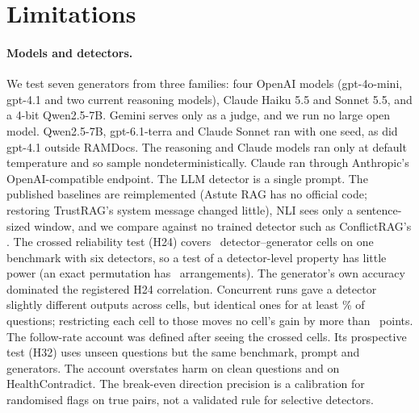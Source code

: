 \section*{Limitations}

\paragraph{Models and detectors.} We test seven generators from three families: four OpenAI models (gpt-4o-mini,
gpt-4.1 and two current reasoning models), Claude Haiku 5.5 and Sonnet 5.5, and a 4-bit Qwen2.5-7B. Gemini
serves only as a judge, and we run no large open model. Qwen2.5-7B, gpt-6.1-terra and Claude Sonnet ran with one seed,
as did gpt-4.1 outside RAMDocs. The reasoning and Claude models ran only at default temperature and so sample
nondeterministically. Claude ran through Anthropic's OpenAI-compatible endpoint. The LLM detector is a single
prompt. The published baselines are reimplemented (Astute RAG has no official code; restoring TrustRAG's system message
changed little), NLI sees only a sentence-sized window, and we compare against no trained detector such as
ConflictRAG's \citep{wang2026conflictrag}. The crossed reliability test (H24) covers \hTwentyFourCells\
detector--generator cells on one benchmark with six detectors, so a test of a detector-level property has little
power (an exact permutation has \hRedoNPerm\ arrangements). The generator's own accuracy dominated the
registered H24 correlation. Concurrent runs gave a detector slightly different outputs across cells, but identical
ones for at least \frozenShareMin\% of questions; restricting each cell to those moves no
cell's gain by more than \frozenMaxShift\ points. The follow-rate account was defined after seeing the crossed cells. Its prospective
test (H32) uses unseen questions but the same benchmark, prompt and generators. The account overstates harm on
clean questions and on HealthContradict. The break-even direction precision is a calibration for randomised flags on true pairs, not a validated
rule for selective detectors.

